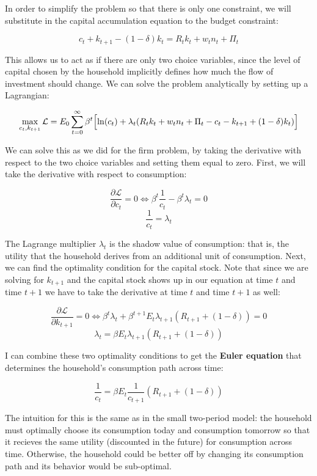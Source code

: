\documentclass[12pt]{article}
\begin{document}
In order to simplify the problem so that there is only one constraint, we will substitute in the capital accumulation equation to the budget constraint:

\[ c_t + k_{t+1} - (1-\delta) k_t = R_t k_t + w_t n_t + \Pi_t \]

This allows us to act as if there are only two choice variables, since the level of capital chosen by the household implicitly defines how much the flow of investment should change. We can solve the problem analytically by setting up a Lagrangian:

\[ \max_{c_t,k_{t+1}} \mathcal{L}  = E_0 \sum_{t=0}^{\infty} \beta^t \Bigl[ \ln(c_t) + \lambda_t (R_t k_t + w_t n_t + \Pi_t - c_t - k_{t+1} + (1-\delta) k_t) \Bigr] \]

We can solve this as we did for the firm problem, by taking the derivative with respect to the two choice variables and setting them equal to zero. First, we will take the derivative with respect to consumption:

\[ \frac{\partial \mathcal{L}}{\partial c_t} = 0 \iff \beta^t \frac{1}{c_t} - \beta^t \lambda_t = 0 \]
\[ \frac{1}{c_t} = \lambda_t \]

The Lagrange multiplier \(\lambda_t\) is the shadow value of consumption: that is, the utility that the household derives from an additional unit of consumption. Next, we can find the optimality condition for the capital stock. Note that since we are solving for \(k_{t+1}\) and the capital stock shows up in our equation at time \(t\) and time \(t+1\) we have to take the derivative at time \(t\) and time \(t+1\) as well:

\[ \frac{\partial \mathcal{L}}{\partial k_{t+1}} = 0 \iff \beta^t \lambda_t + \beta^{t+1} E_t \lambda_{t+1} (R_{t+1} + (1-\delta)) = 0 \]
\[ \lambda_t = \beta E_t \lambda_{t+1} (R_{t+1} + (1-\delta)) \]

I can combine these two optimality conditions to get the \textbf{Euler equation} that determines the household's consumption path across time:

\begin{equation}
\frac{1}{c_t} = \beta E_t \frac{1}{c_{t+1}}(R_{t+1} + (1-\delta))
\end{equation}

The intuition for this is the same as in the small two-period model: the household must optimally choose its consumption today and consumption tomorrow so that it recieves the same utility (discounted in the future) for consumption across time. Otherwise, the household could be better off by changing its consumption path and its behavior would be sub-optimal.
\end{document}
